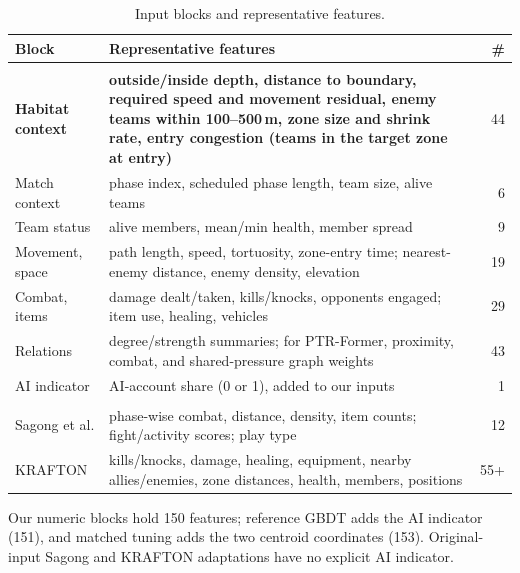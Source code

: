 \documentclass[sigconf,anonymous,nonacm]{acmart}
\begin{document}
\begin{table}[t]
\centering
\caption{Input blocks and representative features.}
\label{tab:blocks}
\footnotesize
\setlength{\tabcolsep}{3pt}
\begin{tabular}{>{\raggedright\arraybackslash}p{1.45cm}p{5.8cm}r}
\hline
Block & Representative features & \# \\
\hline
\multicolumn{3}{l}{\emph{Ours}} \\
\textbf{Habitat context} & \textbf{outside/inside depth, distance to boundary, required speed and movement residual, enemy teams within 100--500\,m, zone size and shrink rate, entry congestion (teams in the target zone at entry)} & 44 \\
Match context & phase index, scheduled phase length, team size, alive teams & 6 \\
Team status & alive members, mean/min health, member spread & 9 \\
Movement, space & path length, speed, tortuosity, zone-entry time; nearest-enemy distance, enemy density, elevation & 19 \\
Combat, items & damage dealt/taken, kills/knocks, opponents engaged; item use, healing, vehicles & 29 \\
Relations & degree/strength summaries; for PTR-Former, proximity, combat, and shared-pressure graph weights & 43 \\
AI indicator & AI-account share (0 or 1), added to our inputs & 1 \\
\hline
\multicolumn{3}{l}{\emph{Prior designs}} \\
Sagong et al. & phase-wise combat, distance, density, item counts; fight/activity scores; play type & 12 \\
KRAFTON & kills/knocks, damage, healing, equipment, nearby allies/enemies, zone distances, health, members, positions & 55+ \\
\hline
\end{tabular}
\smallskip
\parbox{\columnwidth}{\scriptsize Our numeric blocks hold 150 features; reference GBDT adds the AI indicator (151), and matched tuning adds the two centroid coordinates (153). Original-input Sagong and KRAFTON adaptations have no explicit AI indicator.}
\end{table}
\end{document}

